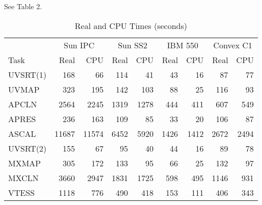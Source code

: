 See Table 2.

\begin{table}[h]
\begin{center}
\begin{tabular}{lrrrrrrrr}
	& \multicolumn{2}{c}{Sun IPC} & \multicolumn{2}{c}{Sun SS2} & \multicolumn{2}{c}{IBM 550} & \multicolumn{2}{c}{Convex C1} \\
Task & Real & CPU & Real & CPU & Real & CPU & Real & CPU \\
\hline

UVSRT(1) &     168 &    66  &   114 &    41  &    43  &   16 & 87 & 77 \\
UVMAP    &     323 &   195  &   142 &   103  &    88  &   25 & 116 & 93 \\
APCLN    &    2564 &  2245  &  1319 &  1278  &   444  &  411 & 607 & 549 \\
APRES    &     236 &   163  &   109 &    85  &    33  &   20 & 106 & 87 \\
ASCAL    &   11687 & 11574  &  6452 &  5920  &  1426  & 1412 & 2672 & 2494 \\
UVSRT(2) &     155 &    67  &    95 &    40  &    44  &   16 & 89 & 78 \\
MXMAP    &     305 &   172  &   133 &    95  &    66  &   25 & 132 & 97 \\
MXCLN    &    3660 &  2947  &  1831 &  1725  &   598  &  495 & 1146 & 931 \\
VTESS    &    1118 &   776  &   490 &   418  &   153  &  111 & 406 & 343 \\
\end{tabular}
\end{center}
\caption{Real and CPU Times (seconds)}
\end{table}

